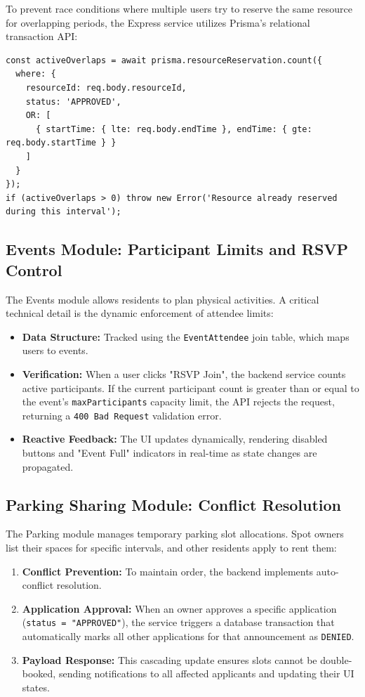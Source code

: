 To prevent race conditions where multiple users try to reserve the same resource for overlapping periods, the Express service utilizes Prisma's relational transaction API:
\begin{lstlisting}
const activeOverlaps = await prisma.resourceReservation.count({
  where: {
    resourceId: req.body.resourceId,
    status: 'APPROVED',
    OR: [
      { startTime: { lte: req.body.endTime }, endTime: { gte: req.body.startTime } }
    ]
  }
});
if (activeOverlaps > 0) throw new Error('Resource already reserved during this interval');
\end{lstlisting}

\subsection{Events Module: Participant Limits and RSVP Control}
The Events module allows residents to plan physical activities. A critical technical detail is the dynamic enforcement of attendee limits:
\begin{itemize}
    \item \textbf{Data Structure:} Tracked using the \texttt{EventAttendee} join table, which maps users to events.
    \item \textbf{Verification:} When a user clicks "RSVP Join", the backend service counts active participants. If the current participant count is greater than or equal to the event's \texttt{maxParticipants} capacity limit, the API rejects the request, returning a \texttt{400 Bad Request} validation error.
    \item \textbf{Reactive Feedback:} The UI updates dynamically, rendering disabled buttons and "Event Full" indicators in real-time as state changes are propagated.
\end{itemize}

\subsection{Parking Sharing Module: Conflict Resolution}
The Parking module manages temporary parking slot allocations. Spot owners list their spaces for specific intervals, and other residents apply to rent them:
\begin{enumerate}
    \item \textbf{Conflict Prevention:} To maintain order, the backend implements auto-conflict resolution. 
    \item \textbf{Application Approval:} When an owner approves a specific application (\texttt{status\allowbreak\ =\allowbreak\ "APPROVED"}), the service triggers a database transaction that automatically marks all other applications for that announcement as \texttt{DENIED}.
    \item \textbf{Payload Response:} This cascading update ensures slots cannot be double-booked, sending notifications to all affected applicants and updating their UI states.
\end{enumerate}

